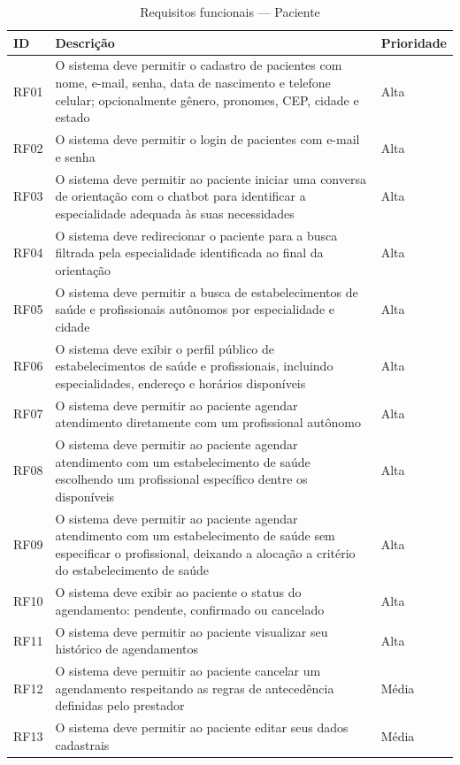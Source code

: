 \begin{table}[H]
  \centering
  \caption{Requisitos funcionais --- Paciente}
  \label{tab:patient-requirements}
  \begin{tabular}{p{1.2cm}p{6.5cm}p{2.5cm}}
    \toprule
    \textbf{ID} &
    \textbf{Descrição} &
    \textbf{Prioridade} \\
    \midrule
    RF01 & O sistema deve permitir o cadastro de
           pacientes com nome, e-mail, senha,
           data de nascimento e telefone celular;
           opcionalmente gênero, pronomes,
           CEP, cidade e estado
         & Alta \\
    RF02 & O sistema deve permitir o login de
           pacientes com e-mail e senha
         & Alta \\
    RF03 & O sistema deve permitir ao paciente
           iniciar uma conversa de orientação com
           o chatbot para identificar a
           especialidade adequada às suas
           necessidades
         & Alta \\
    RF04 & O sistema deve redirecionar o paciente
           para a busca filtrada pela especialidade
           identificada ao final da orientação
         & Alta \\
    RF05 & O sistema deve permitir a busca de
           estabelecimentos de saúde e profissionais autônomos
           por especialidade e cidade
         & Alta \\
    RF06 & O sistema deve exibir o perfil público
           de estabelecimentos de saúde e profissionais, incluindo
           especialidades, endereço e horários
           disponíveis
         & Alta \\
    RF07 & O sistema deve permitir ao paciente
           agendar atendimento diretamente com
           um profissional autônomo
         & Alta \\
    RF08 & O sistema deve permitir ao paciente
           agendar atendimento com um estabelecimento de saúde
           escolhendo um profissional específico
           dentre os disponíveis
         & Alta \\
    RF09 & O sistema deve permitir ao paciente
           agendar atendimento com um estabelecimento de saúde
           sem especificar o profissional,
           deixando a alocação a critério
           do estabelecimento de saúde
         & Alta \\
    RF10 & O sistema deve exibir ao paciente o
           status do agendamento: pendente,
           confirmado ou cancelado
         & Alta \\
    RF11 & O sistema deve permitir ao paciente
           visualizar seu histórico de
           agendamentos
         & Alta \\
    RF12 & O sistema deve permitir ao paciente
           cancelar um agendamento respeitando
           as regras de antecedência definidas
           pelo prestador
         & Média \\
    RF13 & O sistema deve permitir ao paciente
           editar seus dados cadastrais
         & Média \\
    \bottomrule
  \end{tabular}
\end{table}

